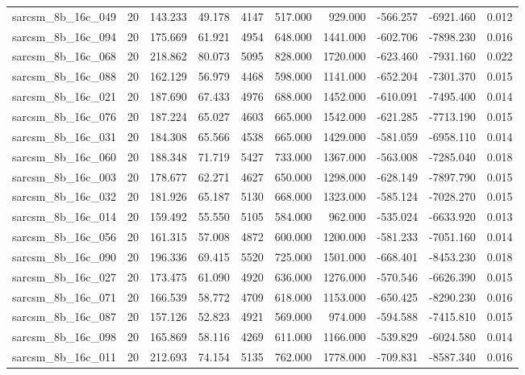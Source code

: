 \begin{tabular}{lrrrrrrrrr}
sarcsm\_8b\_16c\_049 & 20 & 143.233 & 49.178 & 4147 & 517.000 & 929.000 & -566.257 & -6921.460 & 0.012 \\
sarcsm\_8b\_16c\_094 & 20 & 175.669 & 61.921 & 4954 & 648.000 & 1441.000 & -602.706 & -7898.230 & 0.016 \\
sarcsm\_8b\_16c\_068 & 20 & 218.862 & 80.073 & 5095 & 828.000 & 1720.000 & -623.460 & -7931.160 & 0.022 \\
sarcsm\_8b\_16c\_088 & 20 & 162.129 & 56.979 & 4468 & 598.000 & 1141.000 & -652.204 & -7301.370 & 0.015 \\
sarcsm\_8b\_16c\_021 & 20 & 187.690 & 67.433 & 4976 & 688.000 & 1452.000 & -610.091 & -7495.400 & 0.014 \\
sarcsm\_8b\_16c\_076 & 20 & 187.224 & 65.027 & 4603 & 665.000 & 1542.000 & -621.285 & -7713.190 & 0.015 \\
sarcsm\_8b\_16c\_031 & 20 & 184.308 & 65.566 & 4538 & 665.000 & 1429.000 & -581.059 & -6958.110 & 0.014 \\
sarcsm\_8b\_16c\_060 & 20 & 188.348 & 71.719 & 5427 & 733.000 & 1367.000 & -563.008 & -7285.040 & 0.018 \\
sarcsm\_8b\_16c\_003 & 20 & 178.677 & 62.271 & 4627 & 650.000 & 1298.000 & -628.149 & -7897.790 & 0.015 \\
sarcsm\_8b\_16c\_032 & 20 & 181.926 & 65.187 & 5130 & 668.000 & 1323.000 & -585.124 & -7028.270 & 0.015 \\
sarcsm\_8b\_16c\_014 & 20 & 159.492 & 55.550 & 5105 & 584.000 & 962.000 & -535.024 & -6633.920 & 0.013 \\
sarcsm\_8b\_16c\_056 & 20 & 161.315 & 57.008 & 4872 & 600.000 & 1200.000 & -581.233 & -7051.160 & 0.014 \\
sarcsm\_8b\_16c\_090 & 20 & 196.336 & 69.415 & 5520 & 725.000 & 1501.000 & -668.401 & -8453.230 & 0.018 \\
sarcsm\_8b\_16c\_027 & 20 & 173.475 & 61.090 & 4920 & 636.000 & 1276.000 & -570.546 & -6626.390 & 0.015 \\
sarcsm\_8b\_16c\_071 & 20 & 166.539 & 58.772 & 4709 & 618.000 & 1153.000 & -650.425 & -8290.230 & 0.016 \\
sarcsm\_8b\_16c\_087 & 20 & 157.126 & 52.823 & 4921 & 569.000 & 974.000 & -594.588 & -7415.810 & 0.015 \\
sarcsm\_8b\_16c\_098 & 20 & 165.869 & 58.116 & 4269 & 611.000 & 1166.000 & -539.829 & -6024.580 & 0.014 \\
sarcsm\_8b\_16c\_011 & 20 & 212.693 & 74.154 & 5135 & 762.000 & 1778.000 & -709.831 & -8587.340 & 0.016 \\

\end{tabular}
